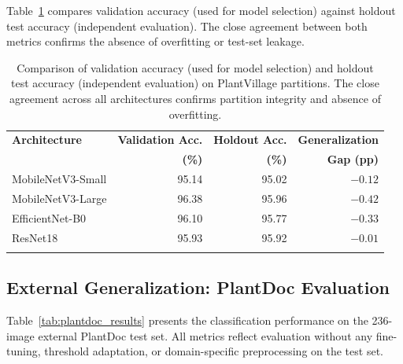 \documentclass[pdflatex,sn-mathphys-num]{sn-jnl}
\theoremstyle{thmstyleone}%
\theoremstyle{thmstyletwo}%
\theoremstyle{thmstylethree}%
\begin{document}
Table~\ref{tab:val_vs_holdout} compares validation accuracy (used for model selection)
against holdout test accuracy (independent evaluation). The close agreement between
both metrics confirms the absence of overfitting or test-set leakage.

\begin{table}[htbp]
\caption{Comparison of validation accuracy (used for model selection) and holdout test accuracy (independent evaluation) on PlantVillage partitions. The close agreement across all architectures confirms partition integrity and absence of overfitting.}\label{tab:val_vs_holdout}%
\footnotesize
\setlength{\tabcolsep}{4pt}%
\begin{tabular*}{\textwidth}{@{\extracolsep\fill}lrrr}
\toprule
\textbf{Architecture} & \textbf{Validation Acc.} & \textbf{Holdout Acc.} & \textbf{Generalization} \\
& \textbf{(\%)} & \textbf{(\%)} & \textbf{Gap (pp)} \\
\midrule
MobileNetV3-Small & 95.14 & 95.02 & $-0.12$ \\
MobileNetV3-Large & 96.38 & 95.96 & $-0.42$ \\
EfficientNet-B0   & 96.10 & 95.77 & $-0.33$ \\
ResNet18          & 95.93 & 95.92 & $-0.01$ \\
\botrule
\end{tabular*}
\end{table}

\subsection{External Generalization: PlantDoc Evaluation}
\label{sec:results_plantdoc}

Table~\ref{tab:plantdoc_results} presents the classification performance on the 236-image
external PlantDoc test set. All metrics reflect evaluation without any fine-tuning,
threshold adaptation, or domain-specific preprocessing on the test set.
\end{document}
